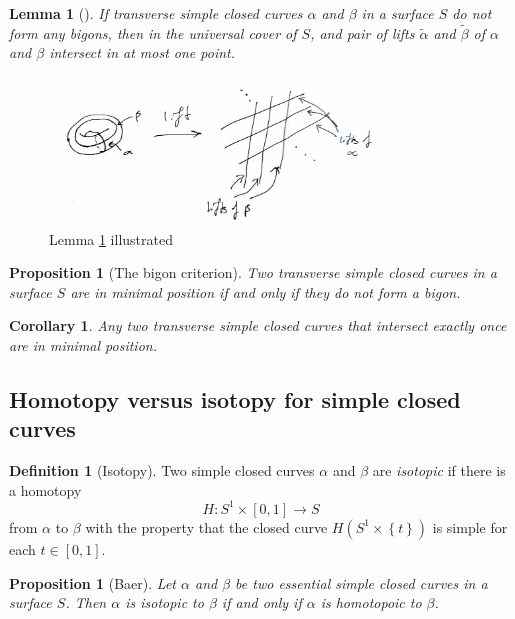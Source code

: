 \documentclass[reqno]{amsart}
\newtheorem{lemma}[theorem]{Lemma}
\newtheorem{proposition}[theorem]{Proposition}
\newtheorem{corollary}[theorem]{Corollary}
\theoremstyle{definition}
\newtheorem{definition}[theorem]{Definition}
\theoremstyle{remark}
\begin{document}
\begin{lemma}[]\label{lemma-intersections-of-lifts}
    If transverse simple closed curves $\alpha$ and $\beta$ in
    a surface $S$ do not form any bigons, then in the
    universal cover of $S$, and pair of lifts
    $\tilde{\alpha}$ and $\tilde{\beta}$ of $\alpha$ and $\beta$ 
    intersect in at most one point.
\end{lemma}

\begin{figure}[h]
    \centering
    \includegraphics[width=0.8\textwidth]{lemma-1-8.jpg}
    \caption{Lemma \ref{lemma-intersections-of-lifts} illustrated}
    \label{fig:lemma-1-8-jpg}
\end{figure}


\begin{proposition}[The bigon criterion]
    Two transverse simple closed curves in a surface $S$ are in
    minimal position if and only if they do not form
    a bigon.
\end{proposition}

\begin{corollary}
    Any two transverse simple closed curves that intersect exactly once are in
    minimal position.
\end{corollary}

\subsection{Homotopy versus isotopy for simple closed curves}

\begin{definition}[Isotopy]
    Two simple closed curves $\alpha$ and $\beta$ are \textit{isotopic}
    if there is a homotopy 
    \[
    H \colon S^{1} \times \left[ 0,1 \right] \to 
    S
    \] 
    from $\alpha$ to $\beta$ with the property that the closed
    curve $H \left( S^{1} \times \left\{ t \right\}  \right) $ 
    is simple for each $t \in \left[ 0,1 \right] $.
\end{definition}

\begin{proposition}[Baer]
    Let $\alpha$ and $\beta$ be two essential simple closed curves
    in a surface $S$. Then $\alpha$ is isotopic to $\beta$ if and
    only if $\alpha$ is homotopoic to $\beta$.
\end{proposition}
\end{document}
